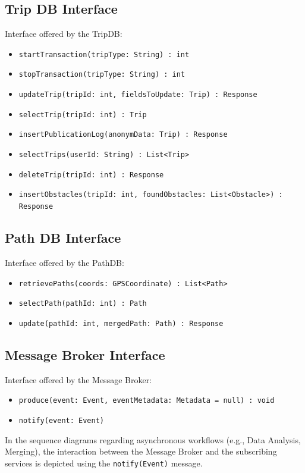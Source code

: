 \subsection{Trip DB Interface}
Interface offered by the TripDB:
\begin{itemize}
    \item \texttt{startTransaction(tripType: String) : int}
    \item \texttt{stopTransaction(tripType: String) : int}
    \item \texttt{updateTrip(tripId: int, fieldsToUpdate: Trip) : Response}
    \item \texttt{selectTrip(tripId: int) : Trip}
    \item \texttt{insertPublicationLog(anonymData: Trip) : Response}
    \item \texttt{selectTrips(userId: String) : List<Trip>}
    \item \texttt{deleteTrip(tripId: int) : Response}
    \item \texttt{insertObstacles(tripId: int, foundObstacles: List<Obstacle>) : Response}
\end{itemize}

\subsection{Path DB Interface}
Interface offered by the PathDB:
\begin{itemize}
    \item \texttt{retrievePaths(coords: GPSCoordinate) : List<Path>}
    \item \texttt{selectPath(pathId: int) : Path}
    \item \texttt{update(pathId: int, mergedPath: Path) : Response}
\end{itemize}

\subsection{Message Broker Interface}
Interface offered by the Message Broker:
\begin{itemize}
    \item \texttt{produce(event: Event, eventMetadata: Metadata = null) : void}
    \item \texttt{notify(event: Event)}
\end{itemize}

In the sequence diagrams regarding asynchronous workflows (e.g., Data Analysis, Merging), the interaction between the Message Broker and the subscribing services is depicted using the \texttt{notify(Event)} message.

